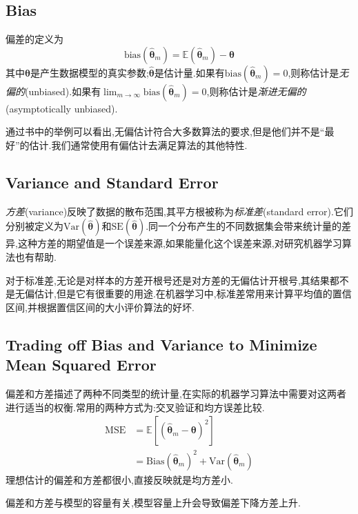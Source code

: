 \subsection{Bias}

偏差的定义为
\begin{equation}
\text{bias}(\hat{\bm\theta}_m)=\mathbb E(\hat{\bm\theta}_m)-{\bm\theta}
\end{equation}
其中${\bm\theta}$是产生数据模型的真实参数;$\hat{\bm\theta}$是估计量.如果有$\text{bias}(\hat{\bm\theta}_m)=0$,则称估计是\textit{无偏的}(unbiased).如果有$\lim_{m\to\infty}\text{bias}(\hat{\bm\theta}_m)=0$,则称估计是\textit{渐进无偏的}(asymptotically unbiased).

通过书中的举例可以看出,无偏估计符合大多数算法的要求,但是他们并不是``最好''的估计.我们通常使用有偏估计去满足算法的其他特性.

\subsection{Variance and Standard Error}

\textit{方差}(variance)反映了数据的散布范围,其平方根被称为\textit{标准差}(standard error).它们分别被定义为$\text{Var}(\hat{\bm\theta})$和$\text{SE}(\hat{\bm\theta})$.同一个分布产生的不同数据集会带来统计量的差异,这种方差的期望值是一个误差来源,如果能量化这个误差来源,对研究机器学习算法也有帮助.

对于标准差,无论是对样本的方差开根号还是对方差的无偏估计开根号,其结果都不是无偏估计,但是它有很重要的用途.在机器学习中,标准差常用来计算平均值的置信区间,并根据置信区间的大小评价算法的好坏.

\subsection{Trading off Bias and Variance to Minimize Mean Squared Error}

偏差和方差描述了两种不同类型的统计量,在实际的机器学习算法中需要对这两者进行适当的权衡.常用的两种方式为:交叉验证和均方误差比较.
\begin{equation}\begin{split}
\text{MSE}&=\mathbb E[(\hat{\bm\theta}_m-{\bm\theta})^2]\\
&=\text{Bias}(\hat{\bm\theta}_m)^2+\text{Var}(\hat{\bm\theta}_m)
\end{split}\end{equation}
理想估计的偏差和方差都很小,直接反映就是均方差小.

偏差和方差与模型的容量有关,模型容量上升会导致偏差下降方差上升.

